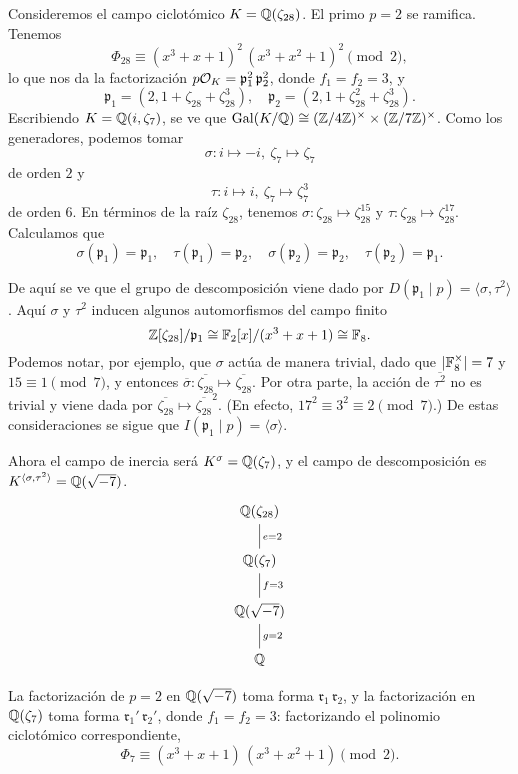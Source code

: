 \begin{ejemplo}
  Consideremos el campo ciclotómico $K = \mathbb{Q} (\zeta_{28})$.
  El primo $p = 2$
  se ramifica. Tenemos
  $$\Phi_{28} \equiv (x^3 + x + 1)^2\,(x^3 + x^2 + 1)^2 \pmod{2},$$
  lo que nos da la factorización
  $p\mathcal{O}_K = \mathfrak{p}_1^2 \, \mathfrak{p}_2^2$,
  donde $f_1 = f_2 = 3$, y
  \[ \mathfrak{p}_1 = (2, 1 + \zeta_{28} + \zeta_{28}^3),
  \quad
  \mathfrak{p}_2 = (2, 1 + \zeta_{28}^2 + \zeta_{28}^3). \]
  Escribiendo $K = \mathbb{Q} (i, \zeta_7)$, se ve que
  $\operatorname{Gal} (K/\mathbb{Q}) \cong (\mathbb{Z}/4\mathbb{Z})^\times \times (\mathbb{Z}/7\mathbb{Z})^\times$.
  Como los generadores, podemos tomar
  $$\sigma\colon i \mapsto -i, ~ \zeta_7 \mapsto \zeta_7$$
  de orden $2$ y
  $$\tau\colon i \mapsto i, ~ \zeta_7 \mapsto \zeta_7^3$$
  de orden $6$. En términos de la raíz $\zeta_{28}$, tenemos
  $\sigma\colon \zeta_{28} \mapsto \zeta_{28}^{15}$ y
  $\tau\colon \zeta_{28} \mapsto \zeta_{28}^{17}$.
  Calculamos que
  \[ \sigma (\mathfrak{p}_1) = \mathfrak{p}_1, \quad
  \tau (\mathfrak{p}_1) = \mathfrak{p}_2, \quad
  \sigma (\mathfrak{p}_2) = \mathfrak{p}_2, \quad
  \tau (\mathfrak{p}_2) = \mathfrak{p}_1. \]

  De aquí se ve que el grupo de descomposición viene dado por
  $D (\mathfrak{p}_1\mid p) = \langle\sigma,\tau^2\rangle$.
  Aquí $\sigma$ y $\tau^2$ inducen algunos automorfismos del campo finito
  $$\mathbb{Z} [\zeta_{28}]/\mathfrak{p}_1 \cong \mathbb{F}_2 [x]/(x^3 + x + 1) \cong \mathbb{F}_8.$$
  Podemos notar, por ejemplo, que $\sigma$ actúa de manera trivial, dado que
  $|\mathbb{F}_8^\times| = 7$ y $15 \equiv 1 \pmod{7}$, y entonces
  $\overline{\sigma}\colon \overline{\zeta_{28}} \mapsto \overline{\zeta_{28}}$.
  Por otra parte, la acción de $\overline{\tau^2}$ no es trivial y viene dada
  por $\overline{\zeta_{28}} \mapsto \overline{\zeta_{28}}^2$. (En efecto,
  $17^2 \equiv 3^2 \equiv 2 \pmod{7}$.)  De estas consideraciones se sigue que
  $I (\mathfrak{p}_1\mid p) = \langle\sigma\rangle$.

  Ahora el campo de inercia será $K^\sigma = \mathbb{Q} (\zeta_7)$, y el campo de
  descomposición es $K^{\langle\sigma,\tau^2\rangle} = \mathbb{Q} (\sqrt{-7})$.
  \[ \begin{tikzcd}
    \QQ (\zeta_{28}) \ar[-]{d}{e = 2} \\
    \QQ (\zeta_7) \ar[-]{d}{f = 3} \\
    \QQ (\sqrt{-7}) \ar[-]{d}{g = 2} \\
    \QQ
  \end{tikzcd} \]

  La factorización de $p = 2$ en $\mathbb{Q} (\sqrt{-7})$ toma forma
  $\mathfrak{r}_1\,\mathfrak{r}_2$, y la factorización en $\mathbb{Q} (\zeta_7)$
  toma forma $\mathfrak{r}_1'\,\mathfrak{r}_2'$, donde $f_1 = f_2 = 3$:
  factorizando el polinomio ciclotómico correspondiente,
  $$\Phi_7 \equiv (x^3 + x + 1)\,(x^3 + x^2 + 1) \pmod{2}.$$


\end{ejemplo}
